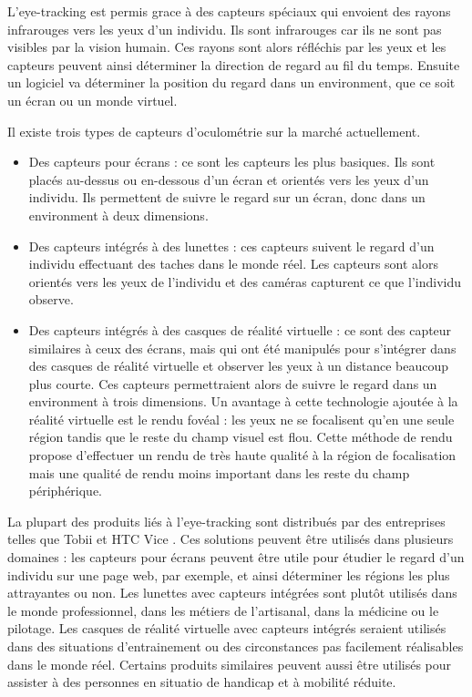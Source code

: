 \documentclass[12pt]{article}
\begin{document}
L'eye-tracking est permis grace à des capteurs spéciaux qui envoient des rayons
infrarouges vers les yeux d'un individu. Ils sont infrarouges car ils ne sont
pas visibles par la vision humain. Ces rayons sont alors réfléchis par les yeux
et les capteurs peuvent ainsi déterminer la direction de regard au fil du temps.
Ensuite un logiciel va déterminer la position du regard dans un environment, que
ce soit un écran ou un monde virtuel.

\bigskip
Il existe trois types de capteurs d'oculométrie sur la marché actuellement.

\begin{itemize}
  \item Des capteurs pour écrans : ce sont les capteurs les plus basiques. Ils
        sont placés au-dessus ou en-dessous d'un écran et orientés vers les yeux
        d'un individu. Ils permettent de suivre le regard sur un écran, donc
        dans un environment à deux dimensions.
  \item Des capteurs intégrés à des lunettes : ces capteurs suivent le regard
        d'un individu effectuant des taches dans le monde réel. Les capteurs
        sont alors orientés vers les yeux de l'individu et des caméras capturent
        ce que l'individu observe.
  \item Des capteurs intégrés à des casques de réalité virtuelle : ce sont des
        capteur similaires à ceux des écrans, mais qui ont été manipulés pour
        s'intégrer dans des casques de réalité virtuelle et observer les yeux à
        un distance beaucoup plus courte. Ces capteurs permettraient alors de
        suivre le regard dans un environment à trois dimensions. Un avantage à
        cette technologie ajoutée à la réalité virtuelle est le rendu fovéal
        \cite{wiki:foveated_rendering} : les yeux ne se focalisent qu'en une
        seule région tandis que le reste du champ visuel est flou. Cette méthode
        de rendu propose d'effectuer un rendu de très haute qualité à la région
        de focalisation mais une qualité de rendu moins important dans les reste
        du champ périphérique.
\end{itemize}

\bigskip
La plupart des produits liés à l'eye-tracking sont distribués par des
entreprises telles que Tobii \cite{tobii} et HTC Vice \cite{htc_vive_pro_eye}.
Ces solutions peuvent être utilisés dans plusieurs domaines : les capteurs pour
écrans peuvent être utile pour étudier le regard d'un individu sur une page web,
par exemple, et ainsi déterminer les régions les plus attrayantes ou non. Les
lunettes avec capteurs intégrées sont plutôt utilisés dans le monde
professionnel, dans les métiers de l'artisanal, dans la médicine ou le pilotage.
Les casques de réalité virtuelle avec capteurs intégrés seraient utilisés dans
des situations d'entrainement ou des circonstances pas facilement réalisables
dans le monde réel. Certains produits similaires peuvent aussi être utilisés
pour assister à des personnes en situatio de handicap et à mobilité réduite.
\end{document}
